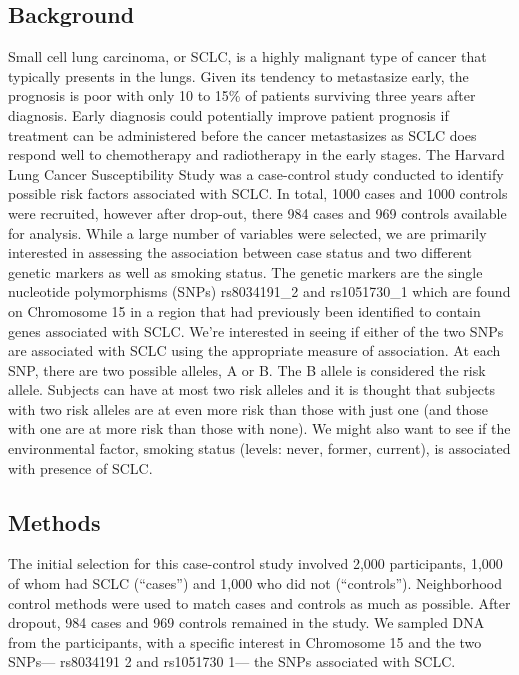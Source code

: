 \documentclass{article}
\begin{document}
	\subsection*{Background}
	Small cell lung carcinoma, or SCLC, is a highly malignant type of cancer that typically presents in the lungs. Given its tendency to metastasize early, the prognosis is poor with only 10 to 15\% of patients surviving three years after diagnosis. Early diagnosis could potentially improve patient prognosis if treatment can be administered before the cancer metastasizes as SCLC does respond well to chemotherapy and radiotherapy in the early stages. The Harvard Lung Cancer Susceptibility Study was a case-control study conducted to identify possible risk factors associated with SCLC. In total, 1000 cases and 1000 controls were recruited, however after drop-out, there 984 cases and 969 controls available for analysis. While a large number of variables were selected, we are primarily interested in assessing the association between case status and two different genetic markers as well as smoking status. The genetic markers are the single nucleotide polymorphisms (SNPs) rs8034191\_2 and rs1051730\_1 which are found on Chromosome 15 in a region that had previously been identified to contain genes associated with SCLC. We're interested in seeing if either of the two SNPs are associated with SCLC using the appropriate measure of association. At each SNP, there are two possible alleles, A or B. The B allele is considered the risk allele. Subjects can have at most two risk alleles and it is thought that subjects with two risk alleles are at even more risk than those with just one (and those with one are at more risk than those with none). We might also want to see if the environmental factor, smoking status (levels: never, former, current), is associated with presence of SCLC.

	\subsection*{Methods}

	The initial selection for this case-control study involved 2,000 participants, 1,000 of whom had SCLC (“cases”) and 1,000 who did not (“controls”). Neighborhood control methods were used to match cases and controls as much as possible. After dropout, 984 cases and 969 controls remained in the study. We sampled DNA from the participants, with a specific interest in Chromosome 15 and the two SNPs— rs8034191 2 and rs1051730 1— the SNPs associated with SCLC.
\end{document}
